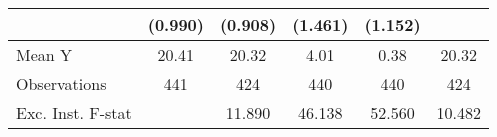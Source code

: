 {\begin{tabular}{l*{5}{c}}
            &     (0.990)         &     (0.908)         &     (1.461)         &     (1.152)         &                     \\
\midrule
Mean Y      &       20.41         &       20.32         &        4.01         &        0.38         &       20.32         \\
Observations&         441         &         424         &         440         &         440         &         424         \\
Exc. Inst. F-stat&                     &      11.890         &      46.138         &      52.560         &      10.482         \\
\bottomrule
\end{tabular}
}
